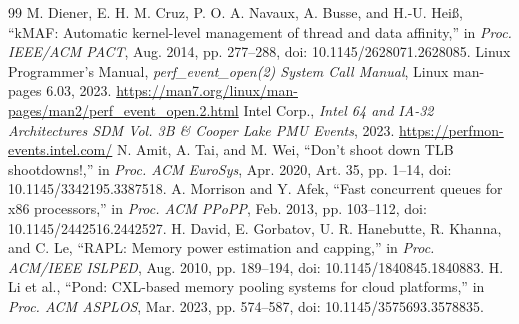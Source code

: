 \documentclass[10pt,twocolumn,letterpaper]{article}
\begin{document}
{\begin{thebibliography}{99}
 M. Diener, E. H. M. Cruz, P. O. A. Navaux, A. Busse, and H.-U. Hei\ss, ``kMAF: Automatic kernel-level management of thread and data affinity,'' in \textit{Proc. IEEE/ACM PACT}, Aug. 2014, pp. 277--288, doi: 10.1145/2628071.2628085.
 Linux Programmer's Manual, \textit{perf\_event\_open(2) System Call Manual}, Linux man-pages 6.03, 2023. \url{https://man7.org/linux/man-pages/man2/perf_event_open.2.html}
 Intel Corp., \textit{Intel 64 and IA-32 Architectures SDM Vol. 3B \& Cooper Lake PMU Events}, 2023. \url{https://perfmon-events.intel.com/}
 N. Amit, A. Tai, and M. Wei, ``Don't shoot down TLB shootdowns!,'' in \textit{Proc. ACM EuroSys}, Apr. 2020, Art. 35, pp. 1--14, doi: 10.1145/3342195.3387518.
 A. Morrison and Y. Afek, ``Fast concurrent queues for x86 processors,'' in \textit{Proc. ACM PPoPP}, Feb. 2013, pp. 103--112, doi: 10.1145/2442516.2442527.
 H. David, E. Gorbatov, U. R. Hanebutte, R. Khanna, and C. Le, ``RAPL: Memory power estimation and capping,'' in \textit{Proc. ACM/IEEE ISLPED}, Aug. 2010, pp. 189--194, doi: 10.1145/1840845.1840883.
 H. Li et al., ``Pond: CXL-based memory pooling systems for cloud platforms,'' in \textit{Proc. ACM ASPLOS}, Mar. 2023, pp. 574--587, doi: 10.1145/3575693.3578835.
\end{thebibliography}
}
\end{document}

